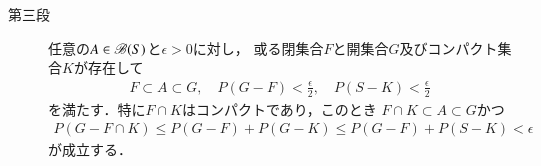 \begin{prf}
\begin{description}
			\item[第三段]
				任意の$A \in \mathscr{B}(S)$と$\epsilon > 0$に対し，
				或る閉集合$F$と開集合$G$及びコンパクト集合$K$が存在して
				\begin{align}
					F \subset A \subset G,
					\quad P(G - F) < \frac{\epsilon}{2},
					\quad P(S - K) < \frac{\epsilon}{2}
				\end{align}
				を満たす．特に$F \cap K$はコンパクトであり，このとき
				$F \cap K \subset A \subset G$かつ
				\begin{align}
					P(G - F \cap K)
					\leq P(G - F) + P(G - K)
					\leq P(G - F) + P(S - K)
					< \epsilon
				\end{align}
				が成立する．
				\QED
		\end{description}
	\end{prf}
	
	\begin{itembox}[l]{}
		
	\end{itembox}